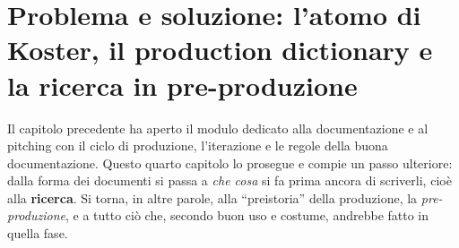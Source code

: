 
\chapter[Problema e soluzione]{Problema e soluzione: l'atomo di Koster, il
production dictionary e la ricerca in pre-produzione}
\label{cap:problema-soluzione}

Il capitolo precedente ha aperto il modulo dedicato alla documentazione e al
pitching con il ciclo di produzione, l'iterazione e le regole della buona
documentazione. Questo quarto capitolo lo prosegue e compie un passo
ulteriore: dalla forma dei documenti si passa a \emph{che cosa} si fa prima
ancora di scriverli, cioè alla \textbf{ricerca}. Si torna, in altre parole,
alla ``preistoria'' della produzione, la \emph{pre-produzione}, e a tutto ciò
che, secondo buon uso e costume, andrebbe fatto in quella fase.

